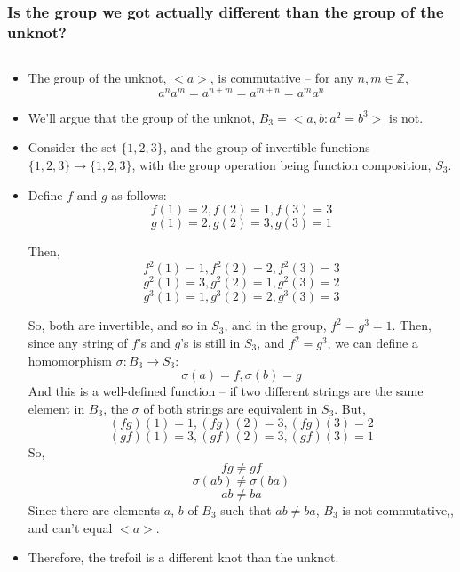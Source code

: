 \documentclass[8pt]{beamer}
\begin{document}
  \begin{frame}
    \frametitle{Is the group we got actually different than the group of the unknot?}
    \begin{columns}
      \begin{column}[T]{0.5\textwidth}
        \begin{itemize}
          \item The group of the unknot, $<a>$, is commutative -- for any $n, m \in \mathbb{Z}$,
            \[a^na^m = a^{n+m} = a^{m+n} = a^ma^n\]
          \item We'll argue that the group of the unknot, $B_3 = <a,b : a^2 = b^3>$ is not.

          \item Consider the set $\{1,2,3\}$, and the group of invertible
            functions $\{1,2,3\} \rightarrow \{1,2,3\}$, with the group operation
            being function composition, $S_3$.
          \item Define $f$ and $g$ as follows:
            \[f(1) = 2, f(2) = 1, f(3) = 3\]
            \[g(1) = 2, g(2) = 3, g(3) = 1\]

            Then,
            \[f^2(1) = 1, f^2(2) = 2, f^2(3) = 3\]
            \[g^2(1) = 3, g^2(2) = 1, g^2(3) = 2\]
            \[g^3(1) = 1, g^3(2) = 2, g^3(3) = 3\]

            So, both are invertible, and so in $S_3$, and in the group,
            $f^2 = g^3 = 1$. Then, since any string of $f$'s and $g$'s is still
            in $S_3$, and $f^2 = g^3$, we can define a homomorphism $\sigma : B_3 \rightarrow S_3$:
            \[\sigma(a) = f, \sigma(b) = g\]
            And this is a well-defined function -- if two different strings are
            the same element in $B_3$, the $\sigma$ of both strings are
            equivalent in $S_3$. But,
            \[(fg)(1) = 1, (fg)(2) = 3, (fg)(3) = 2\]
            \[(gf)(1) = 3, (gf)(2) = 3, (gf)(3) = 1\]
            So,
            \[fg \neq gf\]
            \[\sigma(ab) \neq \sigma (ba)\]
            \[ab \neq ba\]
            Since there are elements $a$, $b$ of $B_3$ such that $ab \neq ba$,
            $B_3$ is not commutative,, and can't equal $<a>$.
          \item Therefore, the trefoil is a different knot than the unknot.
        \end{itemize}
      \end{column}
    \end{columns}
  \end{frame}
\end{document}

